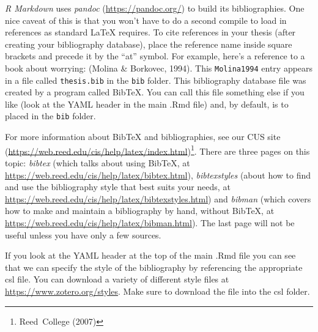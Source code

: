 \documentclass[12pt,twoside]{reedthesis}
\begin{document}
\emph{R Markdown} uses \emph{pandoc} (\url{https://pandoc.org/}) to build its bibliographies. One nice caveat of this is that you won't have to do a second compile to load in references as standard LaTeX requires. To cite references in your thesis (after creating your bibliography database), place the reference name inside square brackets and precede it by the ``at'' symbol. For example, here's a reference to a book about worrying: (Molina \& Borkovec, 1994). This \texttt{Molina1994} entry appears in a file called \texttt{thesis.bib} in the \texttt{bib} folder. This bibliography database file was created by a program called BibTeX. You can call this file something else if you like (look at the YAML header in the main .Rmd file) and, by default, is to placed in the \texttt{bib} folder.

For more information about BibTeX and bibliographies, see our CUS site (\url{https://web.reed.edu/cis/help/latex/index.html})\footnote{Reed~College (2007)}. There are three pages on this topic: \emph{bibtex} (which talks about using BibTeX, at \url{https://web.reed.edu/cis/help/latex/bibtex.html}), \emph{bibtexstyles} (about how to find and use the bibliography style that best suits your needs, at \url{https://web.reed.edu/cis/help/latex/bibtexstyles.html}) and \emph{bibman} (which covers how to make and maintain a bibliography by hand, without BibTeX, at \url{https://web.reed.edu/cis/help/latex/bibman.html}). The last page will not be useful unless you have only a few sources.

If you look at the YAML header at the top of the main .Rmd file you can see that we can specify the style of the bibliography by referencing the appropriate csl file. You can download a variety of different style files at \url{https://www.zotero.org/styles}. Make sure to download the file into the csl folder.

\vfill
\end{document}
